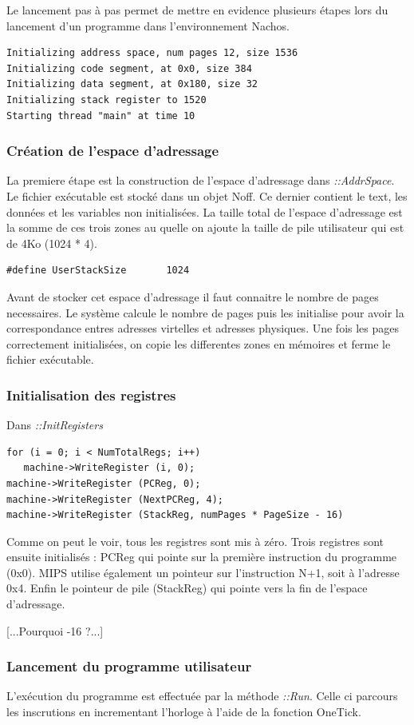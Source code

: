 \documentclass[a4paper,10pt]{article}
\begin{document}
Le lancement pas à pas permet de mettre en evidence plusieurs étapes lors du
lancement d'un programme dans l'environnement Nachos.

\begin{lstlisting}
Initializing address space, num pages 12, size 1536
Initializing code segment, at 0x0, size 384
Initializing data segment, at 0x180, size 32
Initializing stack register to 1520
Starting thread "main" at time 10
\end{lstlisting}

\subsubsection{Création de l'espace d'adressage}

La premiere étape est la construction de l'espace d'adressage dans
\textit{::AddrSpace}. Le fichier exécutable est stocké dans un objet Noff. Ce
dernier contient le text, les données et les variables non initialisées. La
taille total de l'espace d'adressage est la somme de ces trois zones au quelle
on ajoute la taille de pile utilisateur qui est de 4Ko (1024 * 4).

\begin{lstlisting}
#define UserStackSize		1024
\end{lstlisting}

Avant de stocker cet espace d'adressage il faut connaitre le nombre de pages
necessaires. Le système calcule le nombre de pages puis les initialise pour
avoir la correspondance entres adresses virtelles et adresses physiques. Une
fois les pages correctement initialisées, on copie les differentes zones en
mémoires et ferme le fichier exécutable.

\subsubsection{Initialisation des registres}

Dans \textit{::InitRegisters} 
\begin{lstlisting}
for (i = 0; i < NumTotalRegs; i++)
   machine->WriteRegister (i, 0);
machine->WriteRegister (PCReg, 0);
machine->WriteRegister (NextPCReg, 4);
machine->WriteRegister (StackReg, numPages * PageSize - 16)
\end{lstlisting}

Comme on peut le voir, tous les registres sont mis à zéro. Trois
registres sont ensuite initialisés : PCReg qui pointe sur la première
instruction du programme (0x0). MIPS utilise également un pointeur sur
l'instruction N+1, soit à l'adresse 0x4. Enfin le pointeur de pile (StackReg)
qui pointe vers la fin de l'espace d'adressage.

[...Pourquoi -16 ?...]

\subsubsection{Lancement du programme utilisateur}

L'exécution du programme est effectuée par la méthode \textit{::Run}. Celle ci
parcours les inscrutions en incrementant l'horloge à l'aide de la fonction
OneTick.
\end{document}
